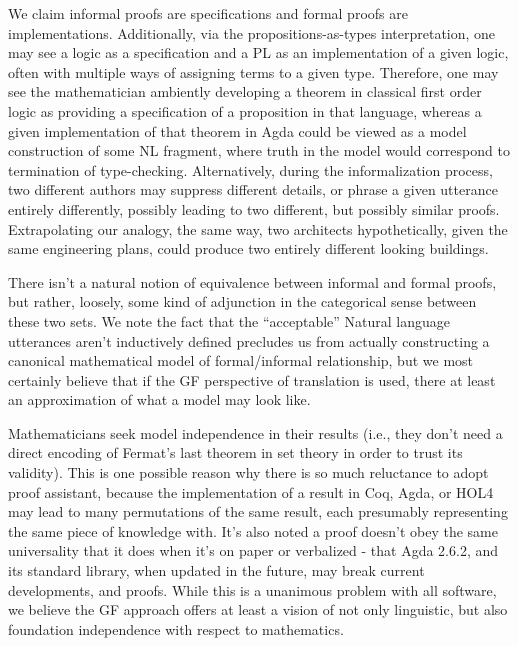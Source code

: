 We claim informal proofs are specifications and formal proofs are implementations.
Additionally, via the propositions-as-types interpretation, one may see a logic
as a specification and a PL as an implementation of a given logic, 
often with multiple ways of assigning terms to a given type. Therefore, one may
see the mathematician ambiently developing a theorem in classical first order
logic as providing a specification of a proposition in that language, whereas a given
implementation of that theorem in Agda could be viewed as a model construction
of some NL fragment, where truth in the model would correspond to termination of
type-checking. Alternatively, during the informalization process, two different
authors may suppress different details, or phrase a given utterance entirely
differently, possibly leading to two different, but possibly similar proofs.
Extrapolating our analogy,
the same way, two architects hypothetically, given the same engineering plans,
could produce two entirely different looking buildings.

There isn't a natural notion of equivalence between informal and formal proofs,
but rather, loosely, some kind of adjunction in the categorical sense between
these two sets. We note the fact that the ``acceptable'' Natural language
utterances aren't inductively defined precludes us from actually constructing a
canonical mathematical model of formal/informal relationship, but we most certainly
believe that if the GF perspective of translation is used, there at least an
approximation of what a model may look like.


Mathematicians seek model independence in their results (i.e., they don't need a
direct encoding of Fermat's last theorem in set theory in order to trust its
validity). This is one possible reason why there is so much reluctance to adopt
proof assistant, because the implementation of a result in Coq, Agda, or HOL4
may lead to many permutations of the same result, each presumably representing
the same piece of knowledge with. It's also noted a proof doesn't obey the same
universality that it does when it's on paper or verbalized - that Agda 2.6.2,
and its standard library, when updated in the future, may break current
developments, and proofs. While this is a unanimous problem with all software,
we believe the GF approach offers at least a vision of not only linguistic, but
also foundation independence with respect to mathematics.

